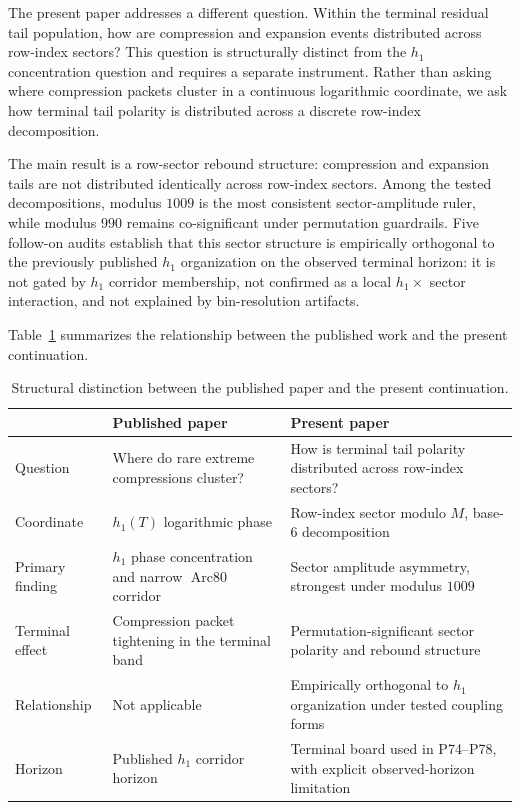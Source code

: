 \documentclass[11pt]{article}
\newcommand{\Arc}{\operatorname{Arc80}}
\begin{document}
The present paper addresses a different question. Within the terminal
residual tail population, how are compression and expansion events
distributed across row-index sectors? This question is structurally
distinct from the $h_1$ concentration question and requires a separate
instrument. Rather than asking where compression packets cluster in a
continuous logarithmic coordinate, we ask how terminal tail polarity is
distributed across a discrete row-index decomposition.

The main result is a row-sector rebound structure: compression and
expansion tails are not distributed identically across row-index
sectors. Among the tested decompositions, modulus $1009$ is the most
consistent sector-amplitude ruler, while modulus $990$ remains
co-significant under permutation guardrails. Five follow-on audits
establish that this sector structure is empirically orthogonal to the
previously published $h_1$ organization on the observed terminal
horizon: it is not gated by $h_1$ corridor membership, not confirmed
as a local $h_1 \times$ sector interaction, and not explained by
bin-resolution artifacts.

Table~\ref{tab:distinction} summarizes the relationship between the
published work and the present continuation.

\begin{table}[H]
\centering
\caption{Structural distinction between the published paper and the
         present continuation.}
\label{tab:distinction}
\renewcommand{\arraystretch}{1.25}
\begin{tabular}{p{}p{}p{}}
\toprule
 & \textbf{Published paper} & \textbf{Present paper} \\
\midrule
Question
  & Where do rare extreme compressions cluster?
  & How is terminal tail polarity distributed across row-index sectors?\\
Coordinate
  & $h_1(T)$ logarithmic phase
  & Row-index sector modulo $M$, base-6 decomposition \\
Primary finding
  & $h_1$ phase concentration and narrow $\Arc$ corridor
  & Sector amplitude asymmetry, strongest under modulus $1009$ \\
Terminal effect
  & Compression packet tightening in the terminal band
  & Permutation-significant sector polarity and rebound structure \\
Relationship
  & Not applicable
  & Empirically orthogonal to $h_1$ organization under tested coupling
    forms \\
Horizon
  & Published $h_1$ corridor horizon
  & Terminal board used in P74--P78, with explicit observed-horizon
    limitation \\
\bottomrule
\end{tabular}
\end{table}
\end{document}
